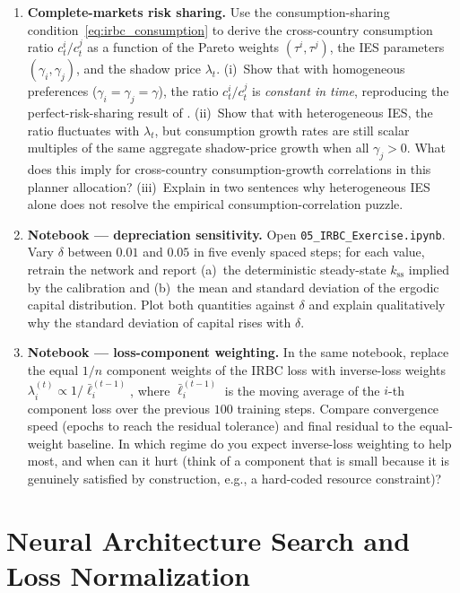 \documentclass[11pt,a4paper]{report}
\begin{document}
\begin{enumerate}[itemsep=4pt, leftmargin=*]
\item\label{ex:ch3:5} \textbf{Complete-markets risk sharing.}  Use the consumption-sharing condition~\eqref{eq:irbc_consumption} to derive the cross-country consumption ratio $c_t^i / c_t^j$ as a function of the Pareto weights $(\tau^i, \tau^j)$, the IES parameters $(\gamma_i, \gamma_j)$, and the shadow price $\lambda_t$.  (i)~Show that with homogeneous preferences ($\gamma_i = \gamma_j = \gamma$), the ratio $c_t^i/c_t^j$ is \emph{constant in time}, reproducing the perfect-risk-sharing result of \citet{backus1992international}.  (ii)~Show that with heterogeneous IES, the ratio fluctuates with $\lambda_t$, but consumption growth rates are still scalar multiples of the same aggregate shadow-price growth when all $\gamma_j>0$.  What does this imply for cross-country consumption-growth correlations in this planner allocation?  (iii)~Explain in two sentences why heterogeneous IES alone does not resolve the empirical consumption-correlation puzzle.
\item\label{ex:ch3:6} \textbf{Notebook --- depreciation sensitivity.}  Open \texttt{05\_IRBC\_Exercise.ipynb}.  Vary $\delta$ between $0.01$ and $0.05$ in five evenly spaced steps; for each value, retrain the network and report (a)~the deterministic steady-state $k_\mathrm{ss}$ implied by the calibration and (b)~the mean and standard deviation of the ergodic capital distribution.  Plot both quantities against $\delta$ and explain qualitatively why the standard deviation of capital rises with $\delta$.
\item\label{ex:ch3:7} \textbf{Notebook --- loss-component weighting.}  In the same notebook, replace the equal $1/n$ component weights of the IRBC loss with inverse-loss weights $\lambda_i^{(t)} \propto 1/\bar{\ell}_i^{(t-1)}$, where $\bar\ell_i^{(t-1)}$ is the moving average of the $i$-th component loss over the previous $100$ training steps.  Compare convergence speed (epochs to reach the residual tolerance) and final residual to the equal-weight baseline.  In which regime do you expect inverse-loss weighting to help most, and when can it hurt (think of a component that is small because it is genuinely satisfied by construction, e.g., a hard-coded resource constraint)?
\end{enumerate}


\chapter{Neural Architecture Search and Loss Normalization}
\label{ch:nas}
\end{document}

